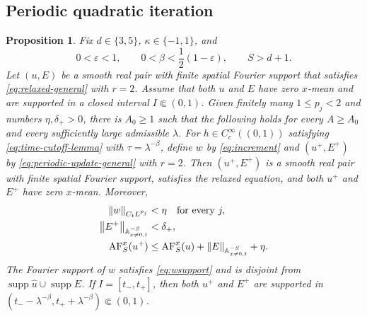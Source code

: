 \documentclass[12pt,reqno,letterpaper]{amsart}
\numberwithin{equation}{section}
\newtheorem{proposition}[theorem]{Proposition}
\theoremstyle{definition}
\newcommand{\A}{\mathbb A}
\newcommand{\eps}{\varepsilon}
\newcommand{\la}{\lambda}
\newcommand{\supp}{\operatorname{supp}}
\newcommand{\norm}[1]{\left\lVert #1\right\rVert}
\begin{document}
\subsection{Periodic quadratic iteration}

\begin{proposition}\label{prop:onestep}
Fix $d\in\{3,5\}$, $\kappa\in\{-1,1\}$, and
\[
   0<\eps<1,
   \qquad 0<\beta<\frac12(1-\eps),
   \qquad S>d+1.
\]
Let $(u,E)$ be a smooth real pair with finite spatial Fourier support that
satisfies \eqref{eq:relaxed-general} with $r=2$.  Assume that both $u$ and
$E$ have zero $x$-mean and are supported in a closed interval
$I\Subset(0,1)$.
Given finitely many $1\leq p_j<2$ and numbers $\eta,\delta_+>0$, there is
$A_0\geq1$ such that the following holds for every $A\geq A_0$ and every
sufficiently large admissible $\la$.  For
$h\in C_c^\infty((0,1))$ satisfying \eqref{eq:time-cutoff-lemma} with
$\tau=\la^{-\beta}$, define $w$ by \eqref{eq:increment} and
$(u^+,E^+)$ by \eqref{eq:periodic-update-general} with $r=2$.  Then
$(u^+,E^+)$ is a smooth real pair with finite spatial Fourier support,
satisfies the relaxed equation, and both $u^+$ and $E^+$ have zero
$x$-mean.  Moreover,
\begin{align}
    \norm{w}_{C_tL^{p_j}}&<\eta
       \quad\text{for every }j,\notag\\
    \norm{E^+}_{\A^{-S}_{x\neq0,t}}&<\delta_+,
       \label{eq:onesteperror}\\
    \operatorname{AF}_S^x(u^+)
       &\leq\operatorname{AF}_S^x(u)
          +\norm{E}_{\A^{-S}_{x\neq0,t}}+\eta.
       \label{eq:onestepQ}
\end{align}
The Fourier support of $w$ satisfies \eqref{eq:wsupport} and is disjoint
from $\supp\widehat u\cup\supp\widehat E$.  If
$I=[t_-,t_+]$, then both $u^+$ and $E^+$ are supported in
$(t_--\la^{-\beta},t_++\la^{-\beta})\Subset(0,1)$.
\end{proposition}
\end{document}
